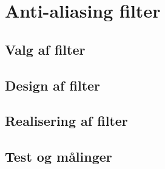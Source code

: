 \section{Anti-aliasing filter}\label{sec:aa_filter}

\subsection{Valg af filter}

\subsection{Design af filter}

\subsection{Realisering af filter}

\subsection{Test og målinger}